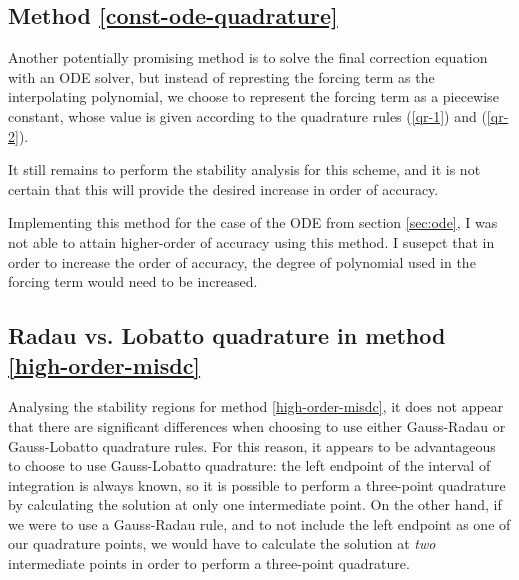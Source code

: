 \documentclass[12pt]{article}
\begin{document}
\subsection{Method \ref{const-ode-quadrature}}
Another potentially promising method is to solve the final correction equation 
with an ODE solver, but instead of represting the forcing term as the 
interpolating polynomial, we choose to represent the forcing term as a piecewise 
constant, whose value is given according to the quadrature rules (\ref{qr-1}) 
and (\ref{qr-2}).

It still remains to perform the stability analysis for this scheme, and it is 
not certain that this will provide the desired increase in order of accuracy.

Implementing this method for the case of the ODE from section \ref{sec:ode}, 
I was not able to attain higher-order of accuracy using this method. 
I susepct that in order to increase the order of accuracy, the degree of 
polynomial used in the forcing term would need to be increased.

\subsection{Radau vs. Lobatto quadrature in method \ref{high-order-misdc}}
Analysing the stability regions for method \ref{high-order-misdc}, it does 
not appear that there are significant differences when choosing to use either 
Gauss-Radau or Gauss-Lobatto quadrature rules. For this reason, it appears 
to be advantageous to choose to use Gauss-Lobatto quadrature: the left endpoint 
of the interval of integration is always known, so it is possible to perform a 
three-point quadrature by calculating the solution at only one intermediate 
point. On the other hand, if we were to use a Gauss-Radau rule, and to not 
include the left endpoint as one of our quadrature points, we would have to 
calculate the solution at \textit{two} intermediate points in order to perform 
a three-point quadrature.
\end{document}
